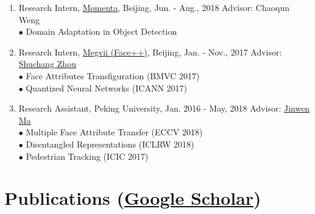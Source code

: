 \documentclass[letterpaper]{article}
\begin{document}
\begin{enumerate}
\item Research Intern, \href{https://www.momenta.ai/en/}{Momenta}, Beijing, Jun. - Aug., 2018 \hfill Advisor: Chaoqun Weng \\
	$\bullet$ Domain Adaptation in Object Detection

\item Research Intern, \href{https://www.faceplusplus.com}{Megvii (Face++)}, Beijing, Jan. - Nov., 2017 \hfill Advisor: \href{https://zsc.github.io/}{Shuchang Zhou}\\
	$\bullet$ Face Attributes Transfiguration (BMVC 2017) \\
	$\bullet$ Quantized Neural Networks (ICANN 2017)

\item Research Assistant, Peking University, Jan. 2016 - May, 2018 \hfill Advisor: \href{https://www.math.pku.edu.cn/teachers/jwma/homepage/}{Jinwen Ma}\\
	$\bullet$ Multiple Face Attribute Transfer (ECCV 2018)\\
	$\bullet$ Disentangled Representations (ICLRW 2018)\\
	$\bullet$ Pedestrian Tracking (ICIC 2017)
	
\end{enumerate}



\section*{Publications (\href{https://scholar.google.com/citations?user=Op_tr2IAAAAJ}{Google Scholar})}
\end{document}
